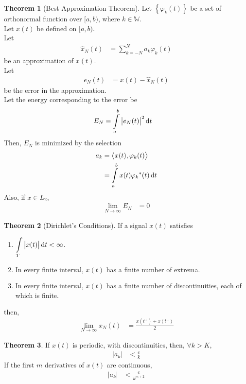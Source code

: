 \documentclass[titlepage, fleqn, a4paper, 12pt, twoside]{article}
\theoremstyle{definition}
\theoremstyle{theorem}
\newtheorem{theorem}{Theorem}
\begin{document}
\begin{theorem}[Best Approximation Theorem]
	Let $\left\{ \varphi_k(t) \right\}$ be a set of orthonormal function over $[a,b)$, where $k \in \mathbb{W}$.\\
	Let $x(t)$ be defined on $[a,b)$.\\
	Let
	\begin{align*}
		\hat{x}_N(t) &= \sum\limits_{k = -N}^{N} a_k \varphi_k(t)
	\end{align*}
	be an approximation of $x(t)$.\\
	Let
	\begin{align*}
		e_N(t) &= x(t) - \hat{x}_N(t)
	\end{align*}
	be the error in the approximation.\\
	Let the energy corresponding to the error be
	\begin{align*}
		E_N &= \int\limits_{a}^{b} \left| e_N(t) \right|^2 \dif t
	\end{align*}
	Then, $E_N$ is minimized by the selection
	\begin{align*}
		a_k &= \left\langle x(t),{\varphi_k}(t) \right\rangle\\
		&= \int\limits_{a}^{b} x(t) {\varphi_k}^*(t) \dif t
	\end{align*}
	Also, if $x \in L_2$,
	\begin{align*}
		\lim\limits_{N \to \infty} E_N &= 0
	\end{align*}
	\label{thm:Best_Approximation_Theorem}
\end{theorem}

\begin{theorem}[Dirichlet's Conditions]
	If a signal $x(t)$ satisfies
	\begin{enumerate}
		\item $\displaystyle \int\limits_{T} \left| x(t) \right| \dif t < \infty$.
		\item In every finite interval, $x(t)$ has a finite number of extrema.
		\item In every finite interval, $x(t)$ has a finite number of discontinuities, each of which is finite.
	\end{enumerate}
	then,
	\begin{align*}
		\lim\limits_{N \to \infty} x_N(t) &= \frac{x(t^+) + x(t^-)}{2}
	\end{align*}
	\label{thm:Dirichlet's_Conditions}
\end{theorem}

\begin{theorem}
	If $x(t)$ is periodic, with discontinuities, then, $\forall k > K$,
	\begin{align*}
		|a_k| &< \frac{c}{k}
	\end{align*}
	If the first $m$ derivatives of $x(t)$ are continuous,
	\begin{align*}
		|a_k| &< \frac{c}{k^{m + 2}}
	\end{align*}
\end{theorem}
\end{document}
